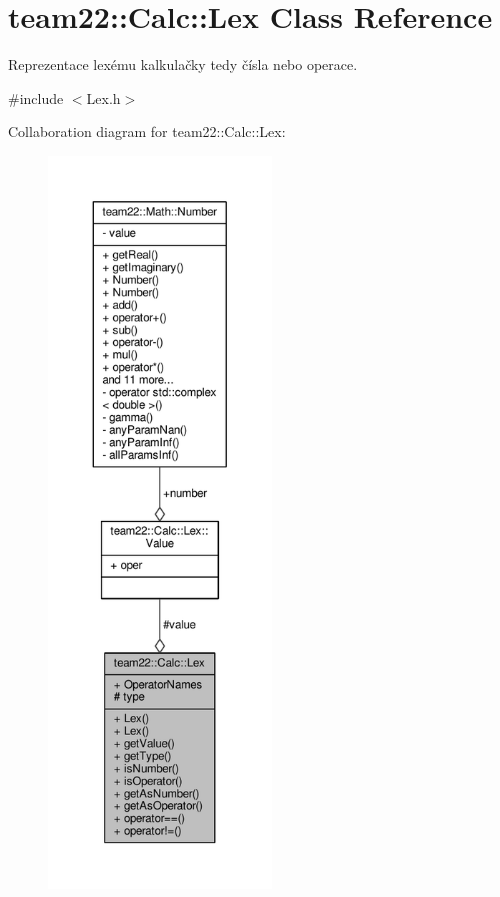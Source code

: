 \hypertarget{classteam22_1_1_calc_1_1_lex}{}\section{team22\+:\+:Calc\+:\+:Lex Class Reference}
\label{classteam22_1_1_calc_1_1_lex}


Reprezentace lexému kalkulačky tedy čísla nebo operace.  




{\ttfamily \#include $<$Lex.\+h$>$}



Collaboration diagram for team22\+:\+:Calc\+:\+:Lex\+:
\nopagebreak
\begin{figure}[H]
\begin{center}
\leavevmode
\includegraphics[height=550pt]{classteam22_1_1_calc_1_1_lex__coll__graph}
\end{center}
\end{figure}
